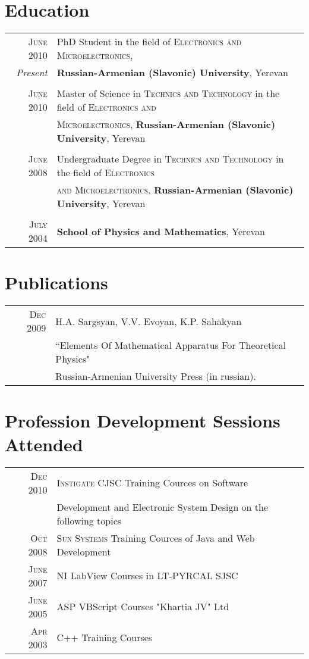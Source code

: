 \documentclass[a4paper,10pt]{article}
\begin{document}
\section{Education}
\begin{tabular}{rl}
\textsc{June} 2010 & PhD Student in the field of
\textsc{Electronics and Microelectronics}, \\ 
\emph{Present} & 
\textbf{Russian-Armenian (Slavonic) University}, Yerevan\\ 
&\\	
\textsc{June} 2010 & Master of Science in \textsc{Technics and Technology}
 in the field of \textsc{Electronics and} \\ & \textsc{Microelectronics}, 
\textbf{Russian-Armenian (Slavonic) University}, Yerevan\\ 
&\\
\textsc{June} 2008 & Undergraduate Degree in \textsc{Technics and Technology}
 in the field of \textsc{Electronics} \\ & \textsc{and Microelectronics}, 
\textbf{Russian-Armenian (Slavonic) University}, Yerevan\\
&\\
\textsc{July} 2004& \textbf{School of Physics and Mathematics}, Yerevan
\end{tabular}

\section{Publications}
\begin{tabular}{rl}
 \textsc{Dec} 2009 & H.A. Sargsyan, V.V. Evoyan, K.P. Sahakyan \\ & ``Elements
 Of Mathematical Apparatus For Theoretical Physics" \\ & Russian-Armenian
 University Press (in russian).
\end{tabular}

\section{Profession Development Sessions Attended}
\begin{tabular}{rl}
\textsc{Dec} 2010 & \textsc{Instigate CJSC} Training Cources on Software \\
                  & Development and Electronic System Design on the following topics \\
\textsc{Oct} 2008 & \textsc{Sun Systems} Training Cources of Java and Web
					Development \\
\textsc{June} 2007 & NI LabView Courses in LT-PYRCAL SJSC \\
\textsc{June} 2005 & ASP VBScript Courses "Khartia JV" Ltd \\
\textsc{Apr} 2003 & C++ Training Courses

\end{tabular}
\end{document}
